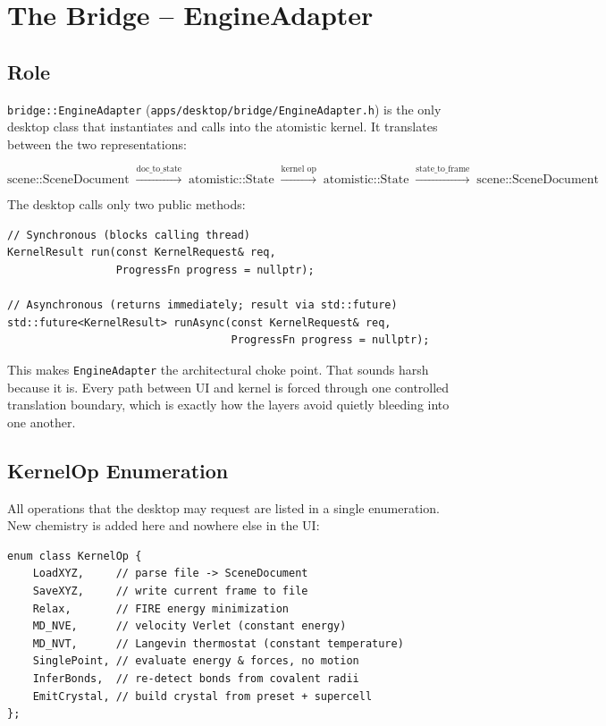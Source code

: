 ﻿\documentclass[11pt]{article}
\newcommand{\file}[1]{\texttt{#1}}
\newcommand{\type}[1]{\texttt{#1}}
\begin{document}
\section{The Bridge -- EngineAdapter}
\label{sec:adapter}

\subsection{Role}

\type{bridge::EngineAdapter} (\file{apps/desktop/bridge/EngineAdapter.h}) is
the only desktop class that instantiates and calls into the atomistic kernel.
It translates between the two representations:

\[
  \text{scene::SceneDocument}
  \;\xrightarrow{\text{doc\_to\_state}}\;
  \text{atomistic::State}
  \;\xrightarrow{\text{kernel op}}\;
  \text{atomistic::State}
  \;\xrightarrow{\text{state\_to\_frame}}\;
  \text{scene::SceneDocument}
\]

The desktop calls only two public methods:

\begin{lstlisting}
// Synchronous (blocks calling thread)
KernelResult run(const KernelRequest& req,
                 ProgressFn progress = nullptr);

// Asynchronous (returns immediately; result via std::future)
std::future<KernelResult> runAsync(const KernelRequest& req,
                                   ProgressFn progress = nullptr);
\end{lstlisting}

This makes \type{EngineAdapter} the architectural choke point. That sounds
harsh because it is. Every path between UI and kernel is forced through one
controlled translation boundary, which is exactly how the layers avoid quietly
bleeding into one another.

\subsection{KernelOp Enumeration}

All operations that the desktop may request are listed in a single
enumeration. New chemistry is added here and nowhere else in the UI:

\begin{lstlisting}
enum class KernelOp {
    LoadXYZ,     // parse file -> SceneDocument
    SaveXYZ,     // write current frame to file
    Relax,       // FIRE energy minimization
    MD_NVE,      // velocity Verlet (constant energy)
    MD_NVT,      // Langevin thermostat (constant temperature)
    SinglePoint, // evaluate energy & forces, no motion
    InferBonds,  // re-detect bonds from covalent radii
    EmitCrystal, // build crystal from preset + supercell
};
\end{lstlisting}
\end{document}
